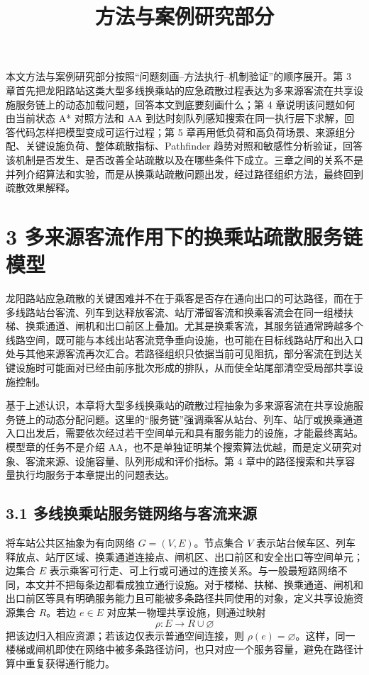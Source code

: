 \documentclass[UTF8,a4paper,12pt]{ctexart}
\title{方法与案例研究部分}
\author{}
\date{}
\begin{document}
\maketitle

本文方法与案例研究部分按照“问题刻画--方法执行--机制验证”的顺序展开。第 3 章首先把龙阳路站这类大型多线换乘站的应急疏散过程表达为多来源客流在共享设施服务链上的动态加载问题，回答本文到底要刻画什么；第 4 章说明该问题如何由当前状态 A* 对照方法和 AA 到达时刻队列感知搜索在同一执行层下求解，回答代码怎样把模型变成可运行过程；第 5 章再用低负荷和高负荷场景、来源组分配、关键设施负荷、整体疏散指标、Pathfinder 趋势对照和敏感性分析验证，回答该机制是否发生、是否改善全站疏散以及在哪些条件下成立。三章之间的关系不是并列介绍算法和实验，而是从换乘站疏散问题出发，经过路径组织方法，最终回到疏散效果解释。

\section{3 多来源客流作用下的换乘站疏散服务链模型}

龙阳路站应急疏散的关键困难并不在于乘客是否存在通向出口的可达路径，而在于多线路站台客流、列车到达释放客流、站厅滞留客流和换乘客流会在同一组楼扶梯、换乘通道、闸机和出口前区上叠加。尤其是换乘客流，其服务链通常跨越多个线路空间，既可能与本线出站客流竞争垂向设施，也可能在目标线路站厅和出入口处与其他来源客流再次汇合。若路径组织只依据当前可见阻抗，部分客流在到达关键设施时可能面对已经由前序批次形成的排队，从而使全站尾部清空受局部共享设施控制。

基于上述认识，本章将大型多线换乘站的疏散过程抽象为多来源客流在共享设施服务链上的动态分配问题。这里的“服务链”强调乘客从站台、列车、站厅或换乘通道入口出发后，需要依次经过若干空间单元和具有服务能力的设施，才能最终离站。模型章的任务不是介绍 AA，也不是单独证明某个搜索算法优越，而是定义研究对象、客流来源、设施容量、队列形成和评价指标。第 4 章中的路径搜索和共享容量执行均服务于本章提出的问题表达。

\subsection{3.1 多线换乘站服务链网络与客流来源}

将车站公共区抽象为有向网络 \(G=(V,E)\)。节点集合 \(V\) 表示站台候车区、列车释放点、站厅区域、换乘通道连接点、闸机区、出口前区和安全出口等空间单元；边集合 \(E\) 表示乘客可行走、可上行或可通过的连接关系。与一般最短路网络不同，本文并不把每条边都看成独立通行设施。对于楼梯、扶梯、换乘通道、闸机和出口前区等具有明确服务能力且可能被多条路径共同使用的对象，定义共享设施资源集合 \(R\)。若边 \(e\in E\) 对应某一物理共享设施，则通过映射
\[
\rho:E\rightarrow R\cup\varnothing
\]
把该边归入相应资源；若该边仅表示普通空间连接，则 \(\rho(e)=\varnothing\)。这样，同一楼梯或闸机即使在网络中被多条路径访问，也只对应一个服务容量，避免在路径计算中重复获得通行能力。
\end{document}
